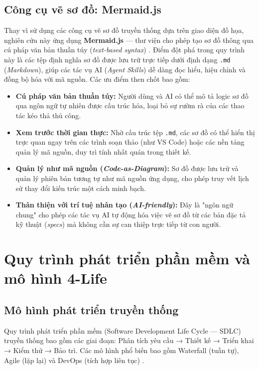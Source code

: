 \documentclass[13pt,a4paper,oneside]{extreport}
\numberwithin{equation}{chapter}
\numberwithin{figure}{chapter}
\numberwithin{table}{chapter}
\begin{document}
\subsection{Công cụ vẽ sơ đồ: Mermaid.js}

Thay vì sử dụng các công cụ vẽ sơ đồ truyền thống dựa trên giao diện đồ họa, nghiên cứu này ứng dụng \textbf{Mermaid.js} — thư viện cho phép tạo sơ đồ thông qua cú pháp văn bản thuần túy (\textit{text-based syntax}) \cite{ref-mermaid}. Điểm đột phá trong quy trình này là các tệp định nghĩa sơ đồ được lưu trữ trực tiếp dưới định dạng \texttt{.md} (\textit{Markdown}), giúp các tác vụ AI (\textit{Agent Skills}) dễ dàng đọc hiểu, hiệu chỉnh và đồng bộ hóa với mã nguồn. Các ưu điểm then chốt bao gồm:

\begin{itemize}
    \item \textbf{Cú pháp văn bản thuần túy:} Người dùng và AI có thể mô tả logic sơ đồ qua ngôn ngữ tự nhiên được cấu trúc hóa, loại bỏ sự rườm rà của các thao tác kéo thả thủ công.
    \item \textbf{Xem trước thời gian thực:} Nhờ cấu trúc tệp \texttt{.md}, các sơ đồ có thể hiển thị trực quan ngay trên các trình soạn thảo (như VS Code) hoặc các nền tảng quản lý mã nguồn, duy trì tính nhất quán trong thiết kế.
    \item \textbf{Quản lý như mã nguồn (\textit{Code-as-Diagram}):} Sơ đồ được lưu trữ và quản lý phiên bản tương tự như mã nguồn ứng dụng, cho phép truy vết lịch sử thay đổi kiến trúc một cách minh bạch.
    \item \textbf{Thân thiện với trí tuệ nhân tạo (\textit{AI-friendly}):} Đây là "ngôn ngữ chung" cho phép các tác vụ AI tự động hóa việc vẽ sơ đồ từ các bản đặc tả kỹ thuật (\textit{specs}) mà không cần sự can thiệp trực tiếp từ con người.
\end{itemize}

\section{Quy trình phát triển phần mềm và mô hình 4-Life}

\subsection{Mô hình phát triển truyền thống}

Quy trình phát triển phần mềm (Software Development Life Cycle — SDLC) truyền thống bao gồm các giai đoạn: Phân tích yêu cầu → Thiết kế → Triển khai → Kiểm thử → Bảo trì. Các mô hình phổ biến bao gồm Waterfall (tuần tự), Agile (lặp lại) và DevOps (tích hợp liên tục) \cite{ref-pressman}.
\end{document}
